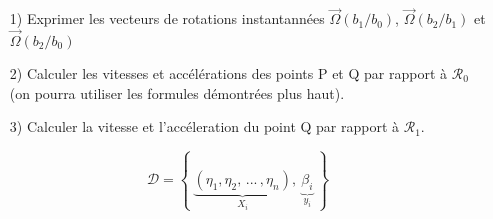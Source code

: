 \documentclass[a4paper,12pt]{article}
\newcommand{\bepar}[1]{
	\left( #1 \right)  
}
\begin{document}
\begin{itemize}
\item[1)] Exprimer les vecteurs de rotations instantannées $\vec{\Omega}(b_1/b_0)$, $\vec{\Omega}(b_2/b_1)$ et $\vec{\Omega}(b_2/b_0)$
\item[2)] Calculer les vitesses et accélérations des points P et Q par rapport à $\mathcal{R}_0$ (on pourra utiliser les formules démontrées plus haut).
\item[3)] Calculer la vitesse et l'accéleration du point Q par rapport à $\mathcal{R}_1$.
\vspace{2mm}
\end{itemize}
\vspace{5mm}

\pagebreak

$$ \mathcal{D} = \left\lbrace \ \underbrace{\bepar{\eta_1,\eta_2,\, ...\,, \eta_n}}_{X_i}, \ \underbrace{\beta_i}_{y_i}\ \right\rbrace $$
	
\end{document}
